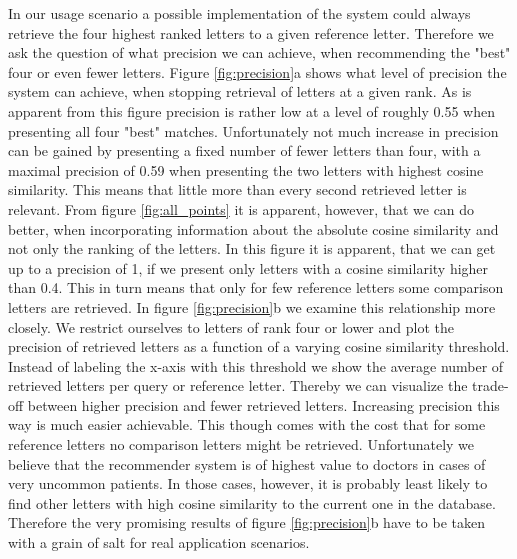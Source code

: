 In our usage scenario a possible implementation of the system could always retrieve the four highest ranked letters to a given reference letter. Therefore we ask the question of what precision we can achieve, when recommending the "best" four or even fewer letters. Figure \ref{fig:precision}a shows what level of precision the system can achieve, when stopping retrieval of letters at a given rank. As is apparent from this figure precision is rather low at a level of roughly 0.55 when presenting all four "best" matches. Unfortunately not much increase in precision can be gained by presenting a fixed number of fewer letters than four, with a maximal precision of 0.59 when presenting the two letters with highest cosine similarity. This means that little more than every second retrieved letter is relevant. From figure \ref{fig:all_points} it is apparent, however, that we can do better, when incorporating information about the absolute cosine similarity and not only the ranking of the letters. In this figure it is apparent, that we can get up to a precision of 1, if we present only letters with a cosine similarity higher than 0.4. This in turn means that only for few reference letters some comparison letters are retrieved. In figure \ref{fig:precision}b we examine this relationship more closely. We restrict ourselves to letters of rank four or lower and plot the precision of retrieved letters as a function of a varying cosine similarity threshold. Instead of labeling the x-axis with this threshold we show the average number of retrieved letters per query or reference letter. Thereby we can visualize the trade-off between higher precision and fewer retrieved letters. Increasing precision this way is much easier achievable. This though comes with the cost that for some reference letters no comparison letters might be retrieved. Unfortunately we believe that the recommender system is of highest value to doctors in cases of very uncommon patients. In those cases, however, it is probably least likely to find other letters with high cosine similarity to the current one in the database. Therefore the very promising results of figure \ref{fig:precision}b have to be taken with a grain of salt for real application scenarios.

